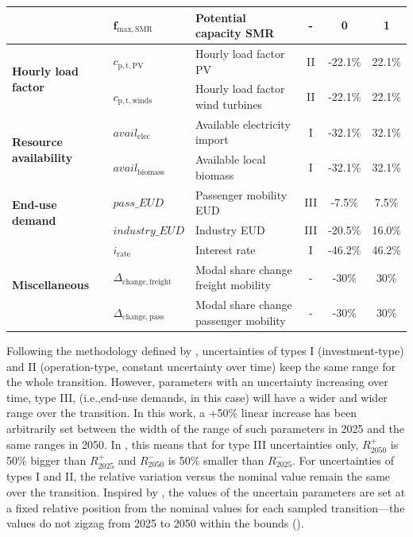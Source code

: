 \documentclass[11pt,twoside,a4paper,english]{article}
\def\ie{i.e.,}
\begin{document}
\begin{appendices}
\begin{table}[htbp!]
{\begin{tabular}{l l l c c c}
& $\bm{f_{\mathrm{max,SMR}}}$ & \textbf{Potential capacity \gls{SMR}} & \textbf{-} & \textbf{0} & \textbf{1} \\
\midrule
\multirow{2}{*}{\textbf{Hourly load factor}} & $c_{\mathrm{p,t,PV}}$ & Hourly load factor PV & II & -22.1\% & 22.1\% \\
& $c_{\mathrm{p,t,winds}}$ & Hourly load factor wind turbines & II & -22.1\% & 22.1\% \\
\midrule
\multirow{2}{*}{\textbf{Resource availability}} & $avail_{\mathrm{elec}}$ & Available electricity import & I & -32.1\% & 32.1\% \\
& $avail_{\mathrm{biomass}}$ & Available local biomass & I & -32.1\% & 32.1\% \\
\midrule

\multirow{2}{*}{\textbf{End-use demand}} & $pass\_EUD$ & Passenger mobility EUD & III & -7.5\% & 7.5\% \\
& $industry\_EUD$ & Industry EUD & III & -20.5\% & 16.0\% \\
\midrule

\multirow{3}{*}{\textbf{Miscellaneous}} &$i_{\mathrm{rate}}$  & Interest rate & I & -46.2\% & 46.2\% \\
& $\Delta_{\mathrm{change,freight}}$ & Modal share change freight mobility & - & -30\% & 30\% \\
& $\Delta_{\mathrm{change,pass}}$ & Modal share change passenger mobility & - & -30\% & 30\% \\


\bottomrule							

\end{tabular}}
\end{table}

Following the methodology defined by \citet{Moret2017}, uncertainties of types I (investment-type) and II (operation-type, constant uncertainty over time) keep the same range for the whole transition. However, parameters with an uncertainty increasing over time, type III, (\ie end-use demands, in this case) will have a wider and wider range over the transition. In this work, a +50\% linear increase has been arbitrarily set between the width of the range of such parameters in 2025 and the same ranges in 2050. In , this means that for type III uncertainties only, $R_{2050}^+$ is 50\% bigger than $R_{2025}^+$ and $R_{2050}^-$ is 50\% smaller than $R_{2025}^-$. For uncertainties of types I and II, the relative variation versus the nominal value remain the same over the transition. Inspired by \citet{guevara2022modeling}, the values of the uncertain parameters are set at a fixed relative position from the nominal values for each sampled transition---the values do not zigzag from 2025 to 2050 within the bounds ().


\end{appendices}
\end{document}
